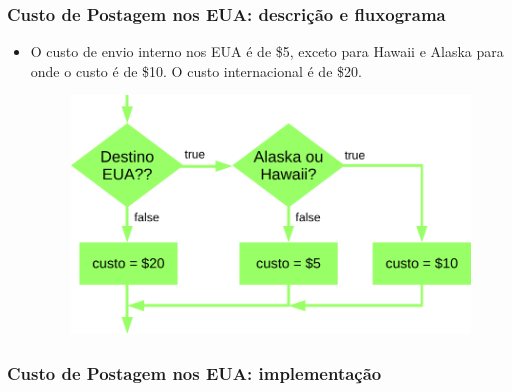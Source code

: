 \documentclass[xcolor={dvipsnames,table},aspectratio=169]{beamer}
\begin{document}
\begin{frame}\frametitle{Custo de Postagem nos EUA: descrição e fluxograma}
\begin{itemize}
	\item O custo de envio interno nos EUA é de \$5, exceto para Hawaii e Alaska para onde o custo é de \$10. O custo internacional é de \$20.
\begin{figure}[h]
	\includegraphics[height=0.50\paperheight,center]{pucrs-ep-fprog-unidade_03-decisoes-laminas-fluxograma_postagem_eua.png}
\end{figure}
\end{itemize}
\end{frame}

\begin{frame}[fragile]\frametitle{Custo de Postagem nos EUA: implementação}
\tiny{\inputminted[bgcolor=cyan!10]{java}{src/PostagemEUA.java}}		
\end{frame}
\end{document}
